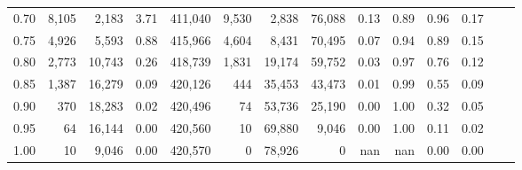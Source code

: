 \begin{tabular}{rrrrrrrrrrrrrr}
0.70 &   8,105 &   2,183 &      3.71 &  411,040 &    9,530 &   2,838 &  76,088 &  0.13 &  0.89 &  0.96 &      0.17 \\
0.75 &   4,926 &   5,593 &      0.88 &  415,966 &    4,604 &   8,431 &  70,495 &  0.07 &  0.94 &  0.89 &      0.15 \\
0.80 &   2,773 &  10,743 &      0.26 &  418,739 &    1,831 &  19,174 &  59,752 &  0.03 &  0.97 &  0.76 &      0.12 \\
0.85 &   1,387 &  16,279 &      0.09 &  420,126 &      444 &  35,453 &  43,473 &  0.01 &  0.99 &  0.55 &      0.09 \\
0.90 &     370 &  18,283 &      0.02 &  420,496 &       74 &  53,736 &  25,190 &  0.00 &  1.00 &  0.32 &      0.05 \\
0.95 &      64 &  16,144 &      0.00 &  420,560 &       10 &  69,880 &   9,046 &  0.00 &  1.00 &  0.11 &      0.02 \\
1.00 &      10 &   9,046 &      0.00 &  420,570 &        0 &  78,926 &       0 &   nan &   nan &  0.00 &      0.00 \\
\bottomrule
\end{tabular}
